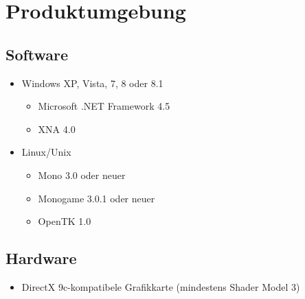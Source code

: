 \chapter{Produktumgebung}

\section{Software}

\begin{itemize} 
\item Windows XP, Vista, 7, 8 oder 8.1
\begin{itemize}
\item Microsoft .NET Framework 4.5 
\item XNA 4.0
\end{itemize}
\item Linux/Unix
\begin{itemize}
\item Mono 3.0 oder neuer
\item Monogame 3.0.1 oder neuer
\item OpenTK 1.0
\end{itemize}
\end{itemize}

\section{Hardware}

\begin{itemize}
\item DirectX 9c-kompatibele Grafikkarte (mindestens Shader Model 3)
\end{itemize}

